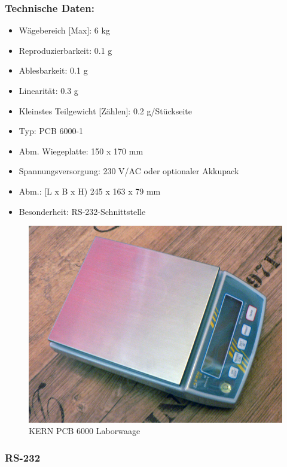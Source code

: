 \subsubsection*{Technische Daten:}

\begin{itemize}
 \item W\"agebereich [Max]: 6 kg
 \item Reproduzierbarkeit: 0.1 g
 \item Ablesbarkeit: 0.1 g
 \item Linearit\"at: 0.3 g
 \item Kleinstes Teilgewicht [Z\"ahlen]: 0.2 g/St\"uckseite
 \item Typ: PCB 6000-1
 \item Abm. Wiegeplatte: 150 x 170 mm
 \item Spannungsversorgung: 230 V/AC oder optionaler Akkupack
 \item Abm.: [L x B x H) 245 x 163 x 79 mm
 \item Besonderheit: RS-232-Schnittstelle
\end{itemize}


\begin{figure}[h]
  \centering
  \includegraphics[scale=0.3]{fotos/devices/KERN_PCB_laborwaage.png}
  \caption{KERN PCB 6000 Laborwaage}
 
\end{figure}

\subsubsection{RS-232}

